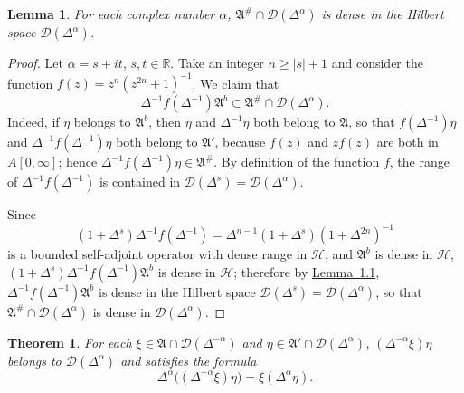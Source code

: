 \documentclass[12pt,b5paper,twoside]{article}
\theoremstyle{takesaki}
\newtheorem{theorem}{Theorem}[section]
\newtheorem{lemma}{Lemma}[section]
\numberwithin{equation}{section}
\begin{document}
\begin{lemma}\label{lem:9.1}
For each complex number $\alpha$,
$\mathfrak A^{\#}\cap\mathcal D(\Delta^\alpha)$ is dense in the Hilbert
space $\mathcal D(\Delta^\alpha)$.
\end{lemma}

\begin{proof}
Let $\alpha=s+it$, $s,t\in\mathbb R$.  Take an integer
$n\geq |s|+1$ and consider the function
$f(z)=z^n(z^{2n}+1)^{-1}$.  We claim that
\[
  \Delta^{-1}f(\Delta^{-1})\mathfrak A^b
  \subset\mathfrak A^{\#}\cap\mathcal D(\Delta^\alpha).
\]
Indeed, if $\eta$ belongs to $\mathfrak A^b$, then $\eta$ and
$\Delta^{-1}\eta$ both belong to $\mathfrak A$, so that
$f(\Delta^{-1})\eta$ and $\Delta^{-1}f(\Delta^{-1})\eta$ both belong to
$\mathfrak A'$, because $f(z)$ and $zf(z)$ are both in
$A[0,\infty]$; hence
$\Delta^{-1}f(\Delta^{-1})\eta\in\mathfrak A^{\#}$.  By definition of
the function $f$, the range of $\Delta^{-1}f(\Delta^{-1})$ is
contained in $\mathcal D(\Delta^s)=\mathcal D(\Delta^\alpha)$.

Since
\[
 (1+\Delta^s)\Delta^{-1}f(\Delta^{-1})
 =\Delta^{n-1}(1+\Delta^s)(1+\Delta^{2n})^{-1}
\]
is a bounded self-adjoint operator with dense range in $\mathcal H$,
and $\mathfrak A^b$ is dense in $\mathcal H$,
$(1+\Delta^s)\Delta^{-1}f(\Delta^{-1})\mathfrak A^b$ is dense in
$\mathcal H$; therefore by \hyperref[lem:1.1]{Lemma~1.1},
$\Delta^{-1}f(\Delta^{-1})\mathfrak A^b$ is dense in the Hilbert space
$\mathcal D(\Delta^s)=\mathcal D(\Delta^\alpha)$, so that
$\mathfrak A^{\#}\cap\mathcal D(\Delta^\alpha)$ is dense in
$\mathcal D(\Delta^\alpha)$.
\end{proof}

\begin{theorem}\label{thm:9.1}
For each $\xi\in\mathfrak A\cap\mathcal D(\Delta^{-\alpha})$ and
$\eta\in\mathfrak A'\cap\mathcal D(\Delta^\alpha)$,
$(\Delta^{-\alpha}\xi)\eta$ belongs to
$\mathcal D(\Delta^\alpha)$ and satisfies the formula
\begin{equation}
 \Delta^\alpha\bigl((\Delta^{-\alpha}\xi)\eta\bigr)
 =\xi(\Delta^\alpha\eta).
 \tag{9.2}\label{eq:9.2}
\end{equation}
\end{theorem}
\end{document}
